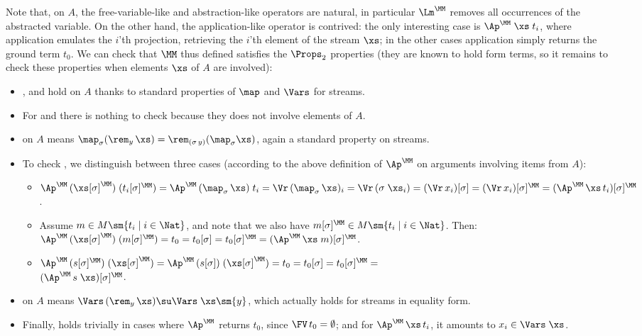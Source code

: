 Note that, on $A$, the free-variable-like and abstraction-like operators are %
 natural, in particular $\Lm^\MM$ removes all occurrences of the abstracted variable. On the other hand, the application-like operator is contrived: the only interesting case is  $\Ap^\MM\;\xs\;t_i$, where application emulates the $i$'th projection, retrieving the $i$'th element of the stream $\xs$; in the other cases application simply returns the ground term $t_0$.  We can check that $\MM$ thus defined satisfies the $\Props_2$ properties (they are known to hold form terms, so it remains to check these properties when elements $\xs$ of $A$ are involved):
\begin{itemize}
	\item \PmId{}, \PmCp{} and \PmFv{} hold on $A$ thanks to standard properties of $\map$ and $\Vars$ for streams. 
	\item For \PmVr{} and \FvVr{} there is nothing to check because they does not involve elements of $A$.
	\item \PmLm{} on $A$ %
	means $\map_\sigma(\rem_y\,\xs) = \rem_{(\sigma\,y)}(\map_\sigma \xs)$, again a standard property on streams. 
	\item To check \PmAp{}, we distinguish between three cases (according to the above definition of $\Ap^\MM$ on arguments involving items from $A$):
	\begin{itemize}
		\item $\Ap^\MM\,(\xs[\sigma]^\MM)\;(t_i[\sigma]^\MM) = 
		\Ap^\MM\,(\map_\sigma\,\xs)\;t_i = \Vr\,(\map_\sigma\,\xs)_i = \Vr\,(\sigma\;\xs_{i}) = (\Vr\,x_i) [\sigma] = (\Vr\,x_i) [\sigma]^\MM = 
		(\Ap^\MM\,\xs\,t_i)[\sigma]^\MM$. 
		\item  Assume $m \in M \sm \{t_i \mid i \in \Nat\}$, and note that we also have %
		$m[\sigma]^\MM \in M \sm \{t_i \mid i \in \Nat\}$. Then:
		$\Ap^\MM\,(\xs[\sigma]^\MM)\;(m[\sigma]^\MM)  = t_0 = t_0[\sigma] = t_0[\sigma]^\MM = (\Ap^\MM\,\xs\;m)[\sigma]^\MM$. 
		\item $\Ap^\MM\,(s[\sigma]^\MM)\;(\xs[\sigma]^\MM) = \Ap^\MM\,(s[\sigma])\;(\xs[\sigma]^\MM) = 
		t_0 = t_0[\sigma] = t_0[\sigma]^\MM = $ \\$(\Ap^\MM\,s\;\xs)[\sigma]^\MM$. 
	\end{itemize} 
	\item \FvLm{} on $A$ means $\Vars\,(\rem_{y}\,\xs) \su \Vars\;\xs \sm \{y\}$, which actually 
	holds for streams in equality form.  
	\item Finally, \FvAp{} holds trivially in cases where $\Ap^\MM$ returns $t_0$, since $\FV\,t_0 = \emptyset$; and for $\Ap^\MM\,\xs\,t_i$, it amounts to $x_i \in \Vars\;\xs$.  
\end{itemize}

